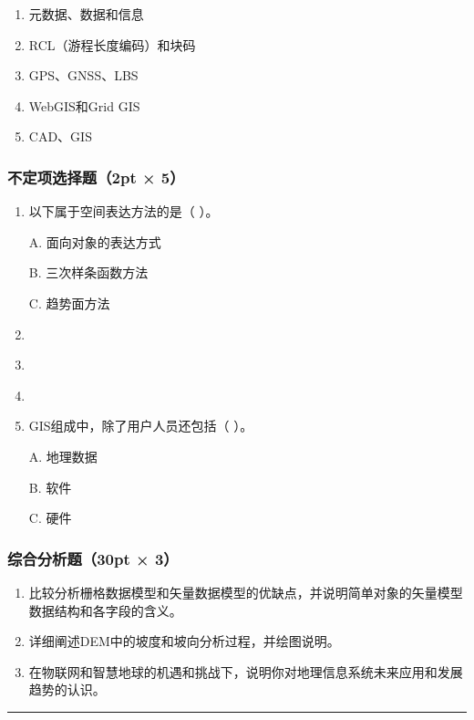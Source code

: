 \documentclass[]{article}
\begin{document}
\begin{enumerate}
\def\labelenumi{\arabic{enumi}.}
\item
  元数据、数据和信息
\item
  RCL（游程长度编码）和块码
\item
  GPS、GNSS、LBS
\item
  WebGIS和Grid GIS
\item
  CAD、GIS
\end{enumerate}

\hypertarget{header-n369}{%
\subsubsection{不定项选择题（2pt × 5）}\label{header-n369}}

\begin{enumerate}
\def\labelenumi{\arabic{enumi}.}
\item
  以下属于空间表达方法的是（ ）。

  A. 面向对象的表达方式

  B. 三次样条函数方法

  C. 趋势面方法
\item
  📄
\item
  📄
\item
  📄
\item
  GIS组成中，除了用户人员还包括（ ）。

  A. 地理数据

  B. 软件

  C. 硬件
\end{enumerate}

\hypertarget{header-n387}{%
\subsubsection{综合分析题（30pt × 3）}\label{header-n387}}

\begin{enumerate}
\def\labelenumi{\arabic{enumi}.}
\item
  比较分析栅格数据模型和矢量数据模型的优缺点，并说明简单对象的矢量模型数据结构和各字段的含义。
\item
  详细阐述DEM中的坡度和坡向分析过程，并绘图说明。
\item
  在物联网和智慧地球的机遇和挑战下，说明你对地理信息系统未来应用和发展趋势的认识。
\end{enumerate}

\begin{center}\rule{0.5\linewidth}{\linethickness}\end{center}
\end{document}
